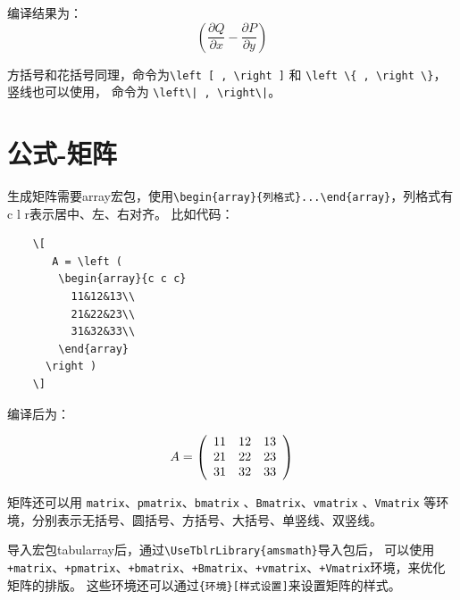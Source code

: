 \documentclass[12pt,a4paper]{ctexart}
\begin{document}
编译结果为：
\[
  \left ( \dfrac{\partial Q}{\partial x} - \dfrac{\partial P}{\partial y} \right )
\]

方括号和花括号同理，命令为\verb|\left [ , \right ]| 和 \verb|\left \{ , \right \}|，竖线也可以使用，
命令为 \verb!\left\| , \right\|!。

\section{公式-矩阵}
生成矩阵需要array宏包，使用\verb|\begin{array}{列格式}...\end{array}|，列格式有c l r表示居中、左、右对齐。
比如代码：

\begin{center}
  \begin{verbatim}
    \[
       A = \left (
        \begin{array}{c c c}
          11&12&13\\
          21&22&23\\
          31&32&33\\    
        \end{array}
      \right ) 
    \]

  \end{verbatim}  
\end{center}

编译后为：

\begin{center}
  \[
    A = \left (
      \begin{array}{c c c}
        11&12&13\\
        21&22&23\\
        31&32&33\\    
      \end{array}
    \right )
  \]
\end{center}

\vspace*{\baselineskip}

矩阵还可以用 \verb|matrix|、\verb|pmatrix|、\verb|bmatrix| 、\verb|Bmatrix|、\verb|vmatrix| 、\verb|Vmatrix| 等环境，分别表示无括号、圆括号、方括号、大括号、单竖线、双竖线。

\vspace*{\baselineskip}

导入宏包tabularray后，通过\verb|\UseTblrLibrary{amsmath}|导入包后，
可以使用\verb|+matrix|、\verb|+pmatrix|、\verb|+bmatrix|、\verb|+Bmatrix|、\verb|+vmatrix|、\verb|+Vmatrix|环境，来优化矩阵的排版。
这些环境还可以通过\verb|{环境}[样式设置]|来设置矩阵的样式。
\end{document}
